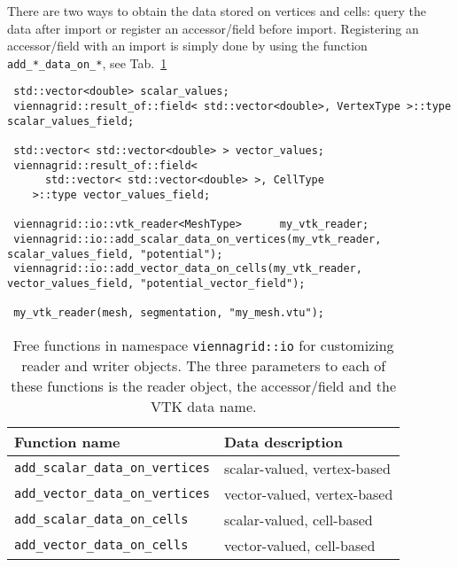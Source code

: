 
There are two ways to obtain the data stored on vertices and cells: query the data after import or register an accessor/field before import.
Registering an accessor/field with an import is simply done by using the function \lstinline|add_*_data_on_*|, see Tab.~\ref{tab:customizing-io}

 \begin{lstlisting}
 std::vector<double> scalar_values;
 viennagrid::result_of::field< std::vector<double>, VertexType >::type scalar_values_field;

 std::vector< std::vector<double> > vector_values;
 viennagrid::result_of::field<
      std::vector< std::vector<double> >, CellType
    >::type vector_values_field;

 viennagrid::io::vtk_reader<MeshType>      my_vtk_reader;
 viennagrid::io::add_scalar_data_on_vertices(my_vtk_reader, scalar_values_field, "potential");
 viennagrid::io::add_vector_data_on_cells(my_vtk_reader, vector_values_field, "potential_vector_field");

 my_vtk_reader(mesh, segmentation, "my_mesh.vtu");
 \end{lstlisting}



 \begin{table}[tb]
 \begin{center}
  \begin{tabular}{|l|l|}
   \hline
   Function name & Data description \\
   \hline
   \lstinline|add_scalar_data_on_vertices| & scalar-valued, vertex-based \\
   \lstinline|add_vector_data_on_vertices| & vector-valued, vertex-based \\
   \hline
   \lstinline|add_scalar_data_on_cells| & scalar-valued, cell-based \\
   \lstinline|add_vector_data_on_cells| & vector-valued, cell-based \\
   \hline
  \end{tabular}
 \end{center}
 \caption{Free functions in namespace \lstinline|viennagrid::io| for customizing reader and writer objects. The three parameters to each of these functions is the reader object, the accessor/field and the VTK data name.}
 \label{tab:customizing-io}
 \end{table}

